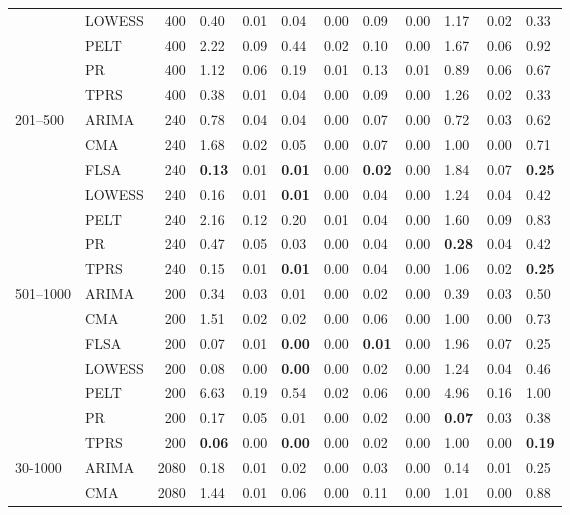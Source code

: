 \begin{table}[ht]
\begin{tabular}{llrlrlrlrlrl}
   & LOWESS & 400 & 0.40 & 0.01 & 0.04 & 0.00 & 0.09 & 0.00 & 1.17 & 0.02 & 0.33 \\ 
   & PELT & 400 & 2.22 & 0.09 & 0.44 & 0.02 & 0.10 & 0.00 & 1.67 & 0.06 & 0.92 \\ 
   & PR & 400 & 1.12 & 0.06 & 0.19 & 0.01 & 0.13 & 0.01 & 0.89 & 0.06 & 0.67 \\ 
   & TPRS & 400 & 0.38 & 0.01 & 0.04 & 0.00 & 0.09 & 0.00 & 1.26 & 0.02 & 0.33 \\ 
  201–500 & ARIMA & 240 & 0.78 & 0.04 & 0.04 & 0.00 & 0.07 & 0.00 & 0.72 & 0.03 & 0.62 \\ 
   & CMA & 240 & 1.68 & 0.02 & 0.05 & 0.00 & 0.07 & 0.00 & 1.00 & 0.00 & 0.71 \\ 
   & FLSA & 240 & \textbf{0.13} & 0.01 & \textbf{0.01} & 0.00 & \textbf{0.02} & 0.00 & 1.84 & 0.07 & \textbf{0.25} \\ 
   & LOWESS & 240 & 0.16 & 0.01 & \textbf{0.01} & 0.00 & 0.04 & 0.00 & 1.24 & 0.04 & 0.42 \\ 
   & PELT & 240 & 2.16 & 0.12 & 0.20 & 0.01 & 0.04 & 0.00 & 1.60 & 0.09 & 0.83 \\ 
   & PR & 240 & 0.47 & 0.05 & 0.03 & 0.00 & 0.04 & 0.00 & \textbf{0.28} & 0.04 & 0.42 \\ 
   & TPRS & 240 & 0.15 & 0.01 & \textbf{0.01} & 0.00 & 0.04 & 0.00 & 1.06 & 0.02 & \textbf{0.25} \\ 
  501–1000 & ARIMA & 200 & 0.34 & 0.03 & 0.01 & 0.00 & 0.02 & 0.00 & 0.39 & 0.03 & 0.50 \\ 
   & CMA & 200 & 1.51 & 0.02 & 0.02 & 0.00 & 0.06 & 0.00 & 1.00 & 0.00 & 0.73 \\ 
   & FLSA & 200 & 0.07 & 0.01 & \textbf{0.00} & 0.00 & \textbf{0.01} & 0.00 & 1.96 & 0.07 & 0.25 \\ 
   & LOWESS & 200 & 0.08 & 0.00 & \textbf{0.00} & 0.00 & 0.02 & 0.00 & 1.24 & 0.04 & 0.46 \\ 
   & PELT & 200 & 6.63 & 0.19 & 0.54 & 0.02 & 0.06 & 0.00 & 4.96 & 0.16 & 1.00 \\ 
   & PR & 200 & 0.17 & 0.05 & 0.01 & 0.00 & 0.02 & 0.00 & \textbf{0.07} & 0.03 & 0.38 \\ 
   & TPRS & 200 & \textbf{0.06} & 0.00 & \textbf{0.00} & 0.00 & 0.02 & 0.00 & 1.00 & 0.00 & \textbf{0.19} \\ 
  30-1000 & ARIMA & 2080 & 0.18 & 0.01 & 0.02 & 0.00 & 0.03 & 0.00 & 0.14 & 0.01 & 0.25 \\ 
   & CMA & 2080 & 1.44 & 0.01 & 0.06 & 0.00 & 0.11 & 0.00 & 1.01 & 0.00 & 0.88 \\ 

\end{tabular}
\end{table}
